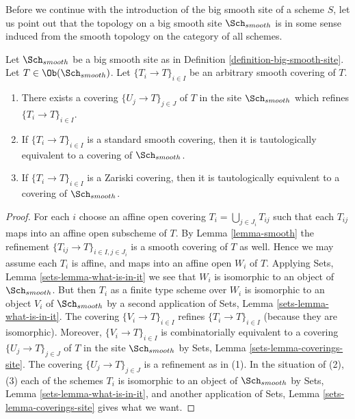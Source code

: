 \medskip\noindent
Before we continue with the introduction of the big smooth site of
a scheme $S$, let us point out that the topology on a big smooth site
$\Sch_{smooth}$ is in some sense induced from the smooth topology
on the category of all schemes.

\begin{lemma}
\label{lemma-smooth-induced}
Let $\Sch_{smooth}$ be a big smooth site as in
Definition \ref{definition-big-smooth-site}.
Let $T \in \Ob(\Sch_{smooth})$.
Let $\{T_i \to T\}_{i \in I}$ be an arbitrary smooth covering of $T$.
\begin{enumerate}
\item There exists a covering $\{U_j \to T\}_{j \in J}$ of $T$ in the site
$\Sch_{smooth}$ which refines $\{T_i \to T\}_{i \in I}$.
\item If $\{T_i \to T\}_{i \in I}$ is a standard smooth covering, then
it is tautologically equivalent to a covering of $\Sch_{smooth}$.
\item If $\{T_i \to T\}_{i \in I}$ is a Zariski covering, then
it is tautologically equivalent to a covering of $\Sch_{smooth}$.
\end{enumerate}
\end{lemma}

\begin{proof}
For each $i$ choose an affine open covering $T_i = \bigcup_{j \in J_i} T_{ij}$
such that each $T_{ij}$ maps into an affine open subscheme of $T$. By
Lemma \ref{lemma-smooth}
the refinement $\{T_{ij} \to T\}_{i \in I, j \in J_i}$ is a smooth covering
of $T$ as well. Hence we may assume each $T_i$ is affine, and maps into
an affine open $W_i$ of $T$. Applying
Sets, Lemma \ref{sets-lemma-what-is-in-it}
we see that $W_i$ is isomorphic to an object of $\Sch_{smooth}$.
But then $T_i$ as a finite type scheme over $W_i$
is isomorphic to an object $V_i$ of $\Sch_{smooth}$ by a second
application of
Sets, Lemma \ref{sets-lemma-what-is-in-it}.
The covering $\{V_i \to T\}_{i \in I}$ refines $\{T_i \to T\}_{i \in I}$
(because they are isomorphic).
Moreover, $\{V_i \to T\}_{i \in I}$ is combinatorially equivalent to a
covering $\{U_j \to T\}_{j \in J}$ of $T$ in the site
$\Sch_{smooth}$ by
Sets, Lemma \ref{sets-lemma-coverings-site}.
The covering $\{U_j \to T\}_{j \in J}$ is a refinement as in (1).
In the situation of (2), (3) each of the
schemes $T_i$ is isomorphic to an object of $\Sch_{smooth}$ by
Sets, Lemma \ref{sets-lemma-what-is-in-it},
and another application of
Sets, Lemma \ref{sets-lemma-coverings-site}
gives what we want.
\end{proof}

